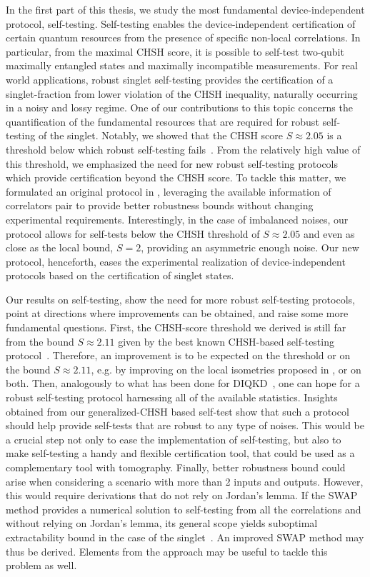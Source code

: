 In the first part of this thesis, we study the most fundamental device-independent protocol, self-testing.
Self-testing enables the device-independent certification of certain quantum resources from the presence of specific non-local correlations.
In particular, from the maximal CHSH score, it is possible to self-test two-qubit maximally entangled states and maximally incompatible measurements.
For real world applications, robust singlet self-testing provides the certification of a singlet-fraction from lower violation of the CHSH inequality, naturally occurring in a noisy and lossy regime. 
One of our contributions to this topic concerns the quantification of the fundamental resources that are required for robust self-testing of the singlet.
Notably, we showed that the CHSH score $S\approx 2.05$ is a threshold below which robust self-testing fails~\cite{Valcarce2020}.
From the relatively high value of this threshold, we emphasized the need for new robust self-testing protocols which provide certification beyond the CHSH score.
To tackle this matter, we formulated an original protocol in \cite{Valcarce2022}, leveraging the available information of correlators pair to provide better robustness bounds without changing experimental requirements.
Interestingly, in the case of imbalanced noises, our protocol allows for self-tests below the CHSH threshold of $S\approx 2.05$ and even as close as the local bound, $S=2$, providing an asymmetric enough noise. 
Our new protocol, henceforth, eases the experimental realization of device-independent protocols based on the certification of singlet states.


\medbreak

Our results on self-testing, show the need for more robust self-testing protocols, point at directions where improvements can be obtained, and raise some more fundamental questions.
First, the CHSH-score threshold we derived is still far from the bound $S\approx 2.11$ given by the best known CHSH-based self-testing protocol~\cite{Kaniewski2016}.
Therefore, an improvement is to be expected on the threshold or on the bound $S\approx 2.11$, e.g. by improving on the local isometries proposed in \cite{Kaniewski2016}, or on both.
Then, analogously to what has been done for DIQKD~\cite{Brown2021}, one can hope for a robust self-testing protocol harnessing all of the available statistics.
Insights obtained from our generalized-CHSH based self-test show that such a protocol should help provide self-tests that are robust to any type of noises.
This would be a crucial step not only to ease the implementation of self-testing, but also to make self-testing a handy and flexible certification tool, that could be used as a complementary tool with tomography.
Finally, better robustness bound could arise when considering a scenario with more than 2 inputs and outputs.
However, this would require derivations that do not rely on Jordan's lemma.
If the SWAP method provides a numerical solution to self-testing from all the correlations and without relying on Jordan's lemma, its general scope yields suboptimal extractability bound in the case of the singlet~\cite{Yang2014,Bancal2015}.
An improved SWAP method may thus be derived.
Elements from the approach \cite{Brown2021} may be useful to tackle this problem as well.


